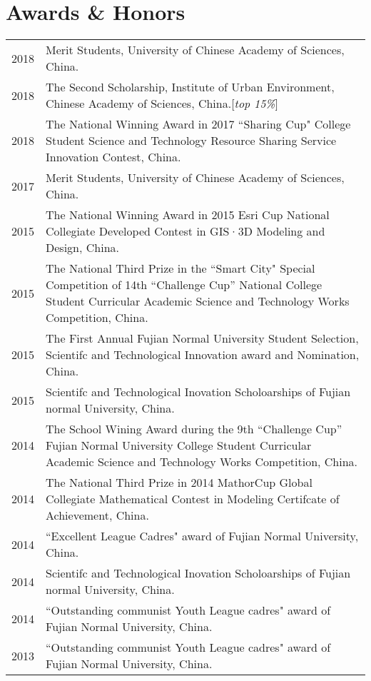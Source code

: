 \section*{Awards \& Honors}

\begin{tabular}{p{} p{}}
2018 & Merit Students, University of Chinese Academy of Sciences, China.\\
2018 & The Second Scholarship, Institute of Urban Environment, Chinese Academy of Sciences, China.[\textit{top 15\%}] \\
2018 & The National Winning Award in 2017 ``Sharing Cup" College Student Science and Technology Resource Sharing Service Innovation Contest, China.\\
2017 & Merit Students, University of Chinese Academy of Sciences, China. \\
2015 & The National Winning Award in 2015 Esri Cup National Collegiate Developed Contest in GIS·3D Modeling and Design, China.\\
2015 & The National Third Prize in the ``Smart City" Special Competition of 14th “Challenge Cup” National College Student Curricular Academic Science and Technology Works Competition, China.\\
2015 & The First Annual Fujian Normal University Student Selection, Scientifc and Technological Innovation award and Nomination, China.\\
2015 & Scientifc and Technological Inovation Scholoarships of Fujian normal University, China.\\
2014 & The School Wining Award during the 9th “Challenge Cup” Fujian Normal University College Student Curricular Academic Science and Technology Works Competition, China.\\
2014 & The National Third Prize in 2014 MathorCup Global Collegiate Mathematical Contest in Modeling Certifcate of Achievement, China.\\
2014 & ``Excellent League Cadres" award of Fujian Normal University, China.\\
2014 & Scientifc and Technological Inovation Scholoarships of Fujian normal University, China.\\
2014 & ``Outstanding communist Youth League cadres" award of Fujian Normal University, China.\\
2013 & ``Outstanding communist Youth League cadres" award of Fujian Normal University, China.\\
\end{tabular}
